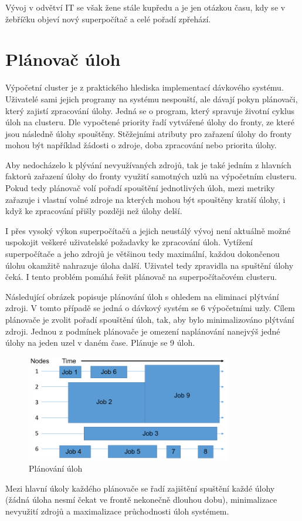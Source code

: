 Vývoj v odvětví IT se však žene stále kupředu a je jen otázkou času, kdy se v žebříčku objeví nový superpočítač a celé pořadí zpřehází.

\section{Plánovač úloh}
Výpočetní cluster je z praktického hlediska implementací dávkového systému. Uživatelé sami jejich programy na systému nespouští, ale dávají pokyn plánovači, který zajistí zpracování úlohy. Jedná se o program, který spravuje životní cyklus úloh na clusteru. Dle vypočtené priority řadí vytvářené úlohy do fronty, ze které jsou následně úlohy spouštěny. Stěžejními atributy pro zařazení úlohy do fronty mohou být například žádosti o zdroje, doba zpracování nebo priorita úlohy.

Aby nedocházelo k plývání nevyužívaných zdrojů, tak je také jedním z hlavních faktorů zařazení úlohy do fronty využití samotných uzlů na výpočetním clusteru. Pokud tedy plánovač volí pořadí spouštění jednotlivých úloh, mezi metriky zařazuje i vlastní volné zdroje na kterých mohou být spouštěny kratší úlohy, i když ke zpracování přišly později než úlohy delší.

I přes vysoký výkon superpočítačů a jejich neustálý vývoj není aktuálně možné uspokojit veškeré uživatelské požadavky ke zpracování úloh. Vytížení superpočítače a jeho zdrojů je většinou tedy maximální, každou dokončenou úlohu okamžitě nahrazuje úloha další. Uživatel tedy zpravidla na spuštění úlohy čeká. I tento problém pomáhá řešit plánovač na superpočítačovém clusteru. 

Následující obrázek popisuje plánování úloh s ohledem na eliminaci plýtvání zdroji. V tomto případě se jedná o dávkový systém se 6 výpočetními uzly. Cílem plánovače je zvolit pořadí spouštění úloh, tak, aby bylo minimalizováno plýtvání zdroji. Jednou z podmínek plánovače je omezení naplánování nanejvýš jedné úlohy na jeden uzel v daném čase. Plánuje se 9 úloh.

\begin{figure}[h]
	\centering
	\includegraphics[width=0.8\textwidth]{Figures/Scheduler.png}
	\caption{Plánování úloh \cite{W94NKRaxvG2L2A1W}}
	\label{fig:planovani-uloh}
\end{figure}

Mezi hlavní úkoly každého plánovače se řadí zajištění spuštění každé úlohy (žádná úloha nesmí čekat ve frontě nekonečně dlouhou dobu), minimalizace nevyužití zdrojů a maximalizace průchodnosti úloh systémem.
